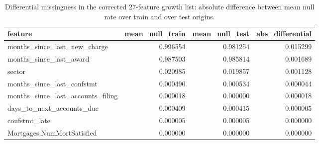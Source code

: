 \begin{table}
\caption{Differential missingness in the corrected 27-feature growth list: absolute difference between mean null rate over train and over test origins.}
\label{tab:growth_g3_differential_missingness}
\begin{tabular}{lrrr}
\toprule
feature & mean_null_train & mean_null_test & abs_differential \\
\midrule
months_since_last_new_charge & 0.996554 & 0.981254 & 0.015299 \\
months_since_last_award & 0.987503 & 0.985814 & 0.001689 \\
sector & 0.020985 & 0.019857 & 0.001128 \\
months_since_last_confstmt & 0.000490 & 0.000534 & 0.000044 \\
months_since_last_accounts_filing & 0.000018 & 0.000000 & 0.000018 \\
days_to_next_accounts_due & 0.000409 & 0.000415 & 0.000005 \\
confstmt_late & 0.000005 & 0.000005 & 0.000000 \\
Mortgages.NumMortSatisfied & 0.000000 & 0.000000 & 0.000000 \\
\bottomrule
\end{tabular}
\end{table}
